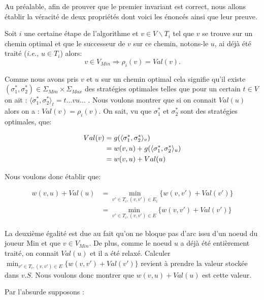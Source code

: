 Au préalable, afin de prouver que le premier invariant est correct, nous allons établir la véracité de deux propriétés dont voici les énoncés ainsi que leur preuve.

\setcounter{equation}{0}

\begin{propriete}
	\label{prop:dijk1}
	Soit $i$ une certaine étape de l'algorithme et $v \in V\backslash T_i $ tel que $v$ se trouve sur un chemin optimal et que le successeur de $v$ sur ce chemin, notons-le $u$, ai déjà été traité (\emph{i.e.,} $u \in T_i$) alors:
	$$ v \in V_{Min} \Rightarrow \rho_i(v) = Val(v).$$
\end{propriete}

\begin{demonstration}
$\text{}$\\
	Comme nous avons pris $v$ et $u$ sur un chemin optimal cela signifie qu'il existe $(\sigma_1^*, \sigma_2^*) \in \Sigma_{Min} \times \Sigma_{Max}$ des stratégies optimales telles que pour un certain $t \in V$ on ait : $\langle \sigma_1^*, \sigma_2^* \rangle_t = t\ldots vu\ldots$ .
Nous voulons montrer que si on connait $Val(u)$ alors on a : $Val(v) = \rho_i(v)$.
On sait, vu que $\sigma_1^*$ et $ \sigma_2^*$ sont des stratégies optimales, que:

\begin{align*}
Val(v) &= g(\langle \sigma_1^*,\sigma_2^* \rangle_v) \notag \\
 	   &= w(v,u) + g(\langle \sigma_1^*,\sigma_2^* \rangle_u) \notag \\
       &= w(v,u) + Val(u) 
\end{align*}

Nous voulons donc établir que:

\begin{align*}
w(v,u) + Val(u) &= \min_{v' \in T_i, (v,v') \in E_i} \{ w(v,v') + Val(v') \}\\ &= \min_{v' \in T_i, (v,v') \in E} \{ w(v,v') + Val(v') \}
\end{align*}

La deuxième égalité est due au fait qu'on ne bloque pas d'arc issu d'un noeud du joueur Min et que $v\in V_{Min}$.
De plus, comme le noeud $u$ a déjà été entièrement traité, on connait $Val(u)$ et il a été relaxé. Calculer $\min_{v' \in T_i, (v,v') \in E} \{ w(v,v') + Val(v') \}$ revient à prendre la valeur stockée dans $v.S$. Nous voulons donc montrer que $w(v,u) + Val(u)$ est cette valeur.

Par l'absurde supposons :


\end{demonstration}
